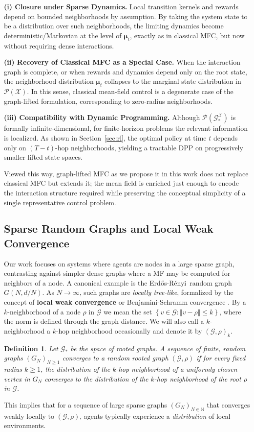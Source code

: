 \documentclass{article}
\newcommand{\Erdos}{Erd\H{o}s}
\newcommand{\Renyi}{R\'enyi}
\newtheorem{definition}{Definition}
\begin{document}
\noindent\textbf{(i) Closure under Sparse Dynamics.}
Local transition kernels and rewards depend on bounded neighborhoods by assumption. By taking the system state to be a distribution over such neighborhoods, the limiting dynamics become deterministic/Markovian at the level of $\boldsymbol\mu_t$, exactly as in classical MFC, but now without requiring dense interactions.

\noindent\textbf{(ii) Recovery of Classical MFC as a Special Case.}
When the interaction graph is complete, or when rewards and dynamics depend only on the root state, the neighborhood distribution $\boldsymbol \mu_t$ collapses to the marginal state distribution in $\mathcal P(\mathcal X)$. In this sense, classical mean-field control is a degenerate case of the graph-lifted formulation, corresponding to zero-radius neighborhoods.

\noindent\textbf{(iii) Compatibility with Dynamic Programming.}
Although $\mathcal P(\mathcal G^\mathcal X_\ast)$ is formally infinite-dimensional, for finite-horizon problems the relevant information is localized. As shown in Section~\ref{sec:rl}, the optimal policy at time $t$ depends only on $(T-t)$-hop neighborhoods, yielding a tractable DPP on progressively smaller lifted state spaces.

Viewed this way, graph-lifted MFC as we propose it in this work does not replace classical MFC but extends it; the mean field is enriched just enough to encode the interaction structure required while preserving the conceptual simplicity of a single representative control problem.

\subsection{Sparse Random Graphs and Local Weak Convergence}
Our work focuses on systems where agents are nodes in a large sparse graph, contrasting against simpler dense graphs where a MF may be computed for neighbors of a node. A canonical example is the \Erdos-\Renyi\ random graph $G(N, d/N)$. As $N \to \infty$, such graphs are \textit{locally tree-like}, formalized by the concept of \textbf{local weak convergence} or Benjamini-Schramm convergence \cite{benjamini2001recurrence}. By a $k$-neighborhood of a node $\rho$ in $\mathcal G$ we mean the set
$\left\{ v \in \mathcal G: \Vert v - \rho \Vert \le k \right\}$,
where the norm is defined through the graph distance. We will also call a $k$-neighborhood a $k$-hop neighborhood occasionally and denote it by $(\mathcal G, \rho)_k$. 
\begin{definition}
    Let $\mathcal{G}_*$ be the space of rooted graphs. A sequence of finite, random graphs $(G_N)_{N \ge 1}$ converges to a random rooted graph $(\mathcal{G}, \rho)$ if for every fixed radius $k \ge 1$, the distribution of the $k$-hop neighborhood of a uniformly chosen vertex in $G_N$ converges to the distribution of the $k$-hop neighborhood of the root $\rho$ in $\mathcal{G}$. 
\end{definition}
This implies that for a sequence of large sparse graphs $(G_N)_{N \in \mathbb N}$ that converges weakly locally to $(\mathcal G, \rho)$, agents typically experience a \textit{distribution} of local environments.
\end{document}
